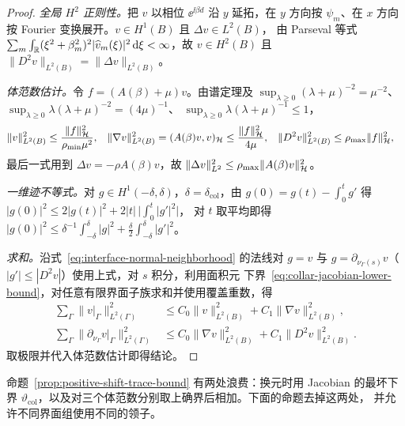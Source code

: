 \begin{workonly}
\begin{proof}
  \emph{全局 $H^2$ 正则性。}把 $v$ 以相位 $\ee^{\ii\beta d}$ 沿 $y$ 延拓，在 $y$ 方向按
  $\psi_m$、在 $x$ 方向按 Fourier 变换展开。$v\in H^1(B)$ 且 $\Delta v\in L^2(B)$，
  由 Parseval 等式
  $\sum_m\int_{\mathbb{R}}(\xi^2+\beta_m^2)^2|\widehat v_m(\xi)|^2\,\mathrm{d}\xi<\infty$，故
  $v\in H^2(B)$ 且 $\lVert D^2v\rVert_{L^2(B)}=\lVert\Delta v\rVert_{L^2(B)}$。

  \emph{体范数估计。}令 $f=(A(\beta)+\mu)v$。由谱定理及
  $\sup_{\lambda\geq0}(\lambda+\mu)^{-2}=\mu^{-2}$、
  $\sup_{\lambda\geq0}\lambda(\lambda+\mu)^{-2}=(4\mu)^{-1}$、
  $\sup_{\lambda\geq0}\lambda(\lambda+\mu)^{-1}\leq1$，
  \begin{align*}
    \lVert v\rVert_{L^2(B)}^2&\leq\frac{\lVert f\rVert_{\mathcal H}^2}{\rho_{\min}\mu^2},
    &\lVert\nabla v\rVert_{L^2(B)}^2&=(A(\beta)v,v)_{\mathcal H}
      \leq\frac{\lVert f\rVert_{\mathcal H}^2}{4\mu},
    &\lVert D^2v\rVert_{L^2(B)}^2&\leq\rho_{\max}\lVert f\rVert_{\mathcal H}^2,
  \end{align*}
  最后一式用到 $\Delta v=-\rho A(\beta)v$，故
  $\lVert\Delta v\rVert_{L^2}^2\leq\rho_{\max}\lVert A(\beta)v\rVert_{\mathcal H}^2$。

  \emph{一维迹不等式。}对 $g\in H^1(-\delta,\delta)$，$\delta=\delta_{\mathrm{col}}$，由
  $g(0)=g(t)-\int_0^tg'$ 得 $|g(0)|^2\leq2|g(t)|^2+2|t|\,\bigl|\int_0^t|g'|^2\bigr|$，
  对 $t$ 取平均即得
  $|g(0)|^2\leq\delta^{-1}\int_{-\delta}^{\delta}|g|^2+\frac{\delta}{2}\int_{-\delta}^{\delta}|g'|^2$。

  \emph{求和。}沿式~\eqref{eq:interface-normal-neighborhood} 的法线对 $g=v$ 与
  $g=\partial_{\nu_\Gamma(s)}v$（$|g'|\leq|D^2v|$）使用上式，对 $s$ 积分，利用面积元
  下界~\eqref{eq:collar-jacobian-lower-bound}，对任意有限界面子族求和并使用覆盖重数，得
  \begin{align*}
    \sum_\Gamma\lVert v|_\Gamma\rVert_{L^2(\Gamma)}^2
    &\leq C_0\lVert v\rVert_{L^2(B)}^2+C_1\lVert\nabla v\rVert_{L^2(B)}^2,\\
    \sum_\Gamma\lVert\partial_{\nu_\Gamma}v|_\Gamma\rVert_{L^2(\Gamma)}^2
    &\leq C_0\lVert\nabla v\rVert_{L^2(B)}^2+C_1\lVert D^2v\rVert_{L^2(B)}^2.
  \end{align*}
  取极限并代入体范数估计即得结论。
\end{proof}

命题~\ref{prop:positive-shift-trace-bound} 有两处浪费：换元时用 Jacobian 的最坏下界
$\vartheta_{\mathrm{col}}$，以及对三个体范数分别取上确界后相加。下面的命题去掉这两处，
并允许不同界面组使用不同的领子。
\end{workonly}

